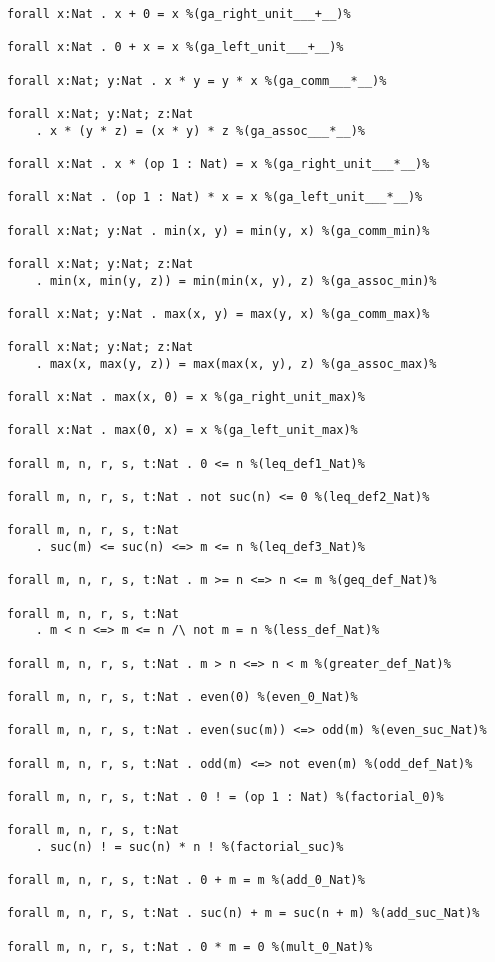 \documentclass[11pt,a4paper]{article}
\begin{document}
\begin{verbatim}
forall x:Nat . x + 0 = x %(ga_right_unit___+__)%

forall x:Nat . 0 + x = x %(ga_left_unit___+__)%

forall x:Nat; y:Nat . x * y = y * x %(ga_comm___*__)%

forall x:Nat; y:Nat; z:Nat
    . x * (y * z) = (x * y) * z %(ga_assoc___*__)%

forall x:Nat . x * (op 1 : Nat) = x %(ga_right_unit___*__)%

forall x:Nat . (op 1 : Nat) * x = x %(ga_left_unit___*__)%

forall x:Nat; y:Nat . min(x, y) = min(y, x) %(ga_comm_min)%

forall x:Nat; y:Nat; z:Nat
    . min(x, min(y, z)) = min(min(x, y), z) %(ga_assoc_min)%

forall x:Nat; y:Nat . max(x, y) = max(y, x) %(ga_comm_max)%

forall x:Nat; y:Nat; z:Nat
    . max(x, max(y, z)) = max(max(x, y), z) %(ga_assoc_max)%

forall x:Nat . max(x, 0) = x %(ga_right_unit_max)%

forall x:Nat . max(0, x) = x %(ga_left_unit_max)%

forall m, n, r, s, t:Nat . 0 <= n %(leq_def1_Nat)%

forall m, n, r, s, t:Nat . not suc(n) <= 0 %(leq_def2_Nat)%

forall m, n, r, s, t:Nat
    . suc(m) <= suc(n) <=> m <= n %(leq_def3_Nat)%

forall m, n, r, s, t:Nat . m >= n <=> n <= m %(geq_def_Nat)%

forall m, n, r, s, t:Nat
    . m < n <=> m <= n /\ not m = n %(less_def_Nat)%

forall m, n, r, s, t:Nat . m > n <=> n < m %(greater_def_Nat)%

forall m, n, r, s, t:Nat . even(0) %(even_0_Nat)%

forall m, n, r, s, t:Nat . even(suc(m)) <=> odd(m) %(even_suc_Nat)%

forall m, n, r, s, t:Nat . odd(m) <=> not even(m) %(odd_def_Nat)%

forall m, n, r, s, t:Nat . 0 ! = (op 1 : Nat) %(factorial_0)%

forall m, n, r, s, t:Nat
    . suc(n) ! = suc(n) * n ! %(factorial_suc)%

forall m, n, r, s, t:Nat . 0 + m = m %(add_0_Nat)%

forall m, n, r, s, t:Nat . suc(n) + m = suc(n + m) %(add_suc_Nat)%

forall m, n, r, s, t:Nat . 0 * m = 0 %(mult_0_Nat)%


\end{verbatim}
\end{document}
